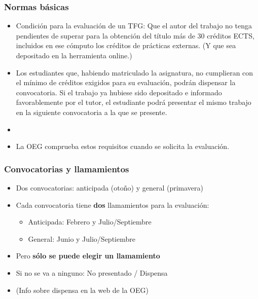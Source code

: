 \documentclass[utf8, xcolor=dvipsnames]{beamer}
\begin{document}
\begin{frame}
\frametitle{Normas básicas}
\centering


\begin{itemize}
  \item Condición para la evaluación de un TFG: Que el autor del trabajo no tenga pendientes de superar para la obtención del título más de 30 créditos ECTS, incluidos en ese cómputo los créditos de prácticas externas. (Y que sea depositado en la herramienta online.)
  \item Los estudiantes que, habiendo matriculado la asignatura, no cumplieran con el mínimo de créditos exigidos para su evaluación, podrán dispensar la convocatoria. Si el trabajo ya hubiese sido depositado e informado favorablemente por el tutor, el estudiante podrá presentar el mismo trabajo en la siguiente convocatoria a la que se presente.
  \item[]
  \item La OEG comprueba estos requisitos cuando se solicita la evaluación.
\end{itemize}


\end{frame}

\begin{frame}
\frametitle{Convocatorias y llamamientos}
\centering

\begin{itemize}
  \item Dos convocatorias: anticipada (otoño) y general (primavera)
  \item Cada convocatoria tiene \textbf{dos} llamamientos para la evaluación:
  \begin{itemize}
    \item Anticipada: Febrero y Julio/Septiembre
    \item General: Junio y Julio/Septiembre
  \end{itemize}
  \item Pero \textbf{sólo se puede elegir un llamamiento}
  \item Si no se va a ninguno: No presentado / Dispensa
  \item[] (Info sobre dispensa en la web de la OEG)
\end{itemize}

\end{frame}
\end{document}
